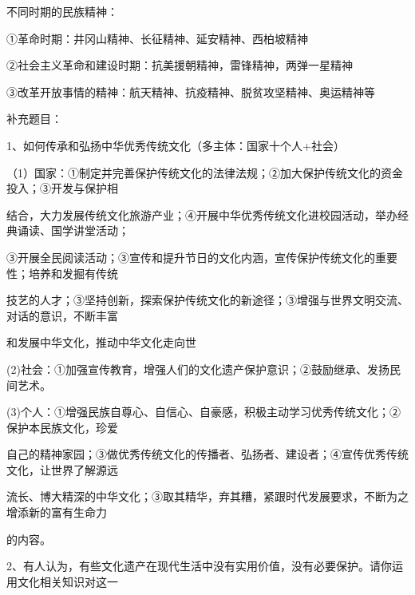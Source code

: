 \documentclass[lang=cn,11pt]{elegantbook}
\newcommand{\daofasym}[1]{{\daofasymbolfont #1}}
\newcommand{\daofasym}[1]{#1}
\begin{document}
不同时期的民族精神：\par

\daofasym{①}革命时期：井冈山精神、长征精神、延安精神、西柏坡精神\par

\daofasym{②}社会主义革命和建设时期：抗美援朝精神，雷锋精神，两弹一星精神\par

\daofasym{③}改革开放事情的精神：航天精神、抗疫精神、脱贫攻坚精神、奥运精神等\par

补充题目：\par

1、如何传承和弘扬中华优秀传统文化（多主体：国家十个人+社会）\par

（1）国家：\daofasym{①}制定并完善保护传统文化的法律法规；\daofasym{②}加大保护传统文化的资金投入；\daofasym{③}开发与保护相\par

结合，大力发展传统文化旅游产业；\daofasym{④}开展中华优秀传统文化进校园活动，举办经典诵读、国学讲堂活动；\par

\daofasym{③}开展全民阅读活动；\daofasym{③}宣传和提升节日的文化内涵，宣传保护传统文化的重要性；培养和发掘有传统\par

技艺的人才；\daofasym{③}坚持创新，探索保护传统文化的新途径；\daofasym{③}增强与世界文明交流、对话的意识，不断丰富\par

和发展中华文化，推动中华文化走向世\par

(2)社会：\daofasym{①}加强宣传教育，增强人们的文化遗产保护意识；\daofasym{②}鼓励继承、发扬民间艺术。\par

(3)个人：\daofasym{①}增强民族自尊心、自信心、自豪感，积极主动学习优秀传统文化；\daofasym{②}保护本民族文化，珍爱\par

自己的精神家园；\daofasym{③}做优秀传统文化的传播者、弘扬者、建设者；\daofasym{④}宣传优秀传统文化，让世界了解源远\par

流长、博大精深的中华文化；\daofasym{③}取其精华，弃其糟，紧跟时代发展要求，不断为之增添新的富有生命力\par

的内容。\par

2、有人认为，有些文化遗产在现代生活中没有实用价值，没有必要保护。请你运用文化相关知识对这一\par
\end{document}
